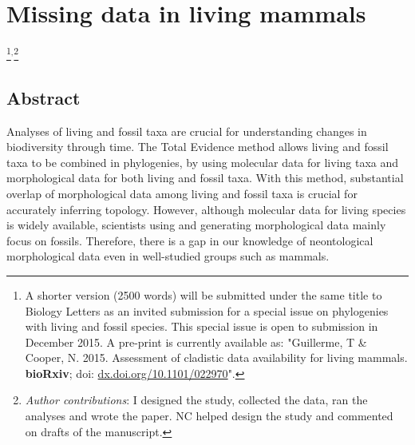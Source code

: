 

%
%

\chapter[Missing data in living mammals]{Missing data in living mammals}
\label{chap:missing_mammals}

\bigskip
\medskip
\begin{center}

\footnote{A shorter version (2500 words) will be submitted under the same title to Biology Letters as an invited submission for a special issue on phylogenies with living and fossil species. This special issue is open to submission in December 2015. A pre-print is currently available as:
"Guillerme, T \& Cooper, N. 2015. Assessment of cladistic data availability for living mammals. \textbf{bioRxiv}; doi: \href{http://dx.doi.org/10.1101/022970}{dx.doi.org/10.1101/022970}".}$^{,}$\footnote{\textit{Author contributions}: I designed the study, collected the data, ran the analyses and wrote the paper. NC helped design the study and commented on drafts of the manuscript.} \\


\end{center}
%
%


\section*{Abstract}
Analyses of living and fossil taxa are crucial for understanding changes in biodiversity through time.
The Total Evidence method allows living and fossil taxa to be combined in phylogenies, by using molecular data for living taxa and morphological data for both living and fossil taxa.
With this method, substantial overlap of morphological data among living and fossil taxa is crucial for accurately inferring topology.
However, although molecular data for living species is widely available, scientists using and generating morphological data mainly focus on fossils.
Therefore, there is a gap in our knowledge of neontological morphological data even in well-studied groups such as mammals.

